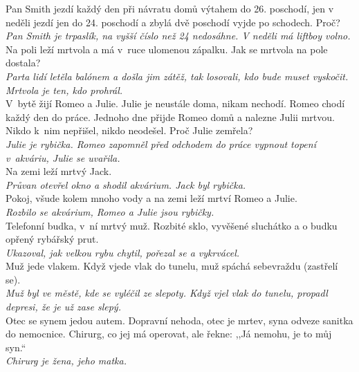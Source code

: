 \begin{multicols}{2}
\noindent
Pan Smith jezdí každý den při návratu domů výtahem do 26. 
poschodí, jen v neděli jezdí jen do 24. poschodí a zbylá dvě 
poschodí vyjde po schodech. Proč?\\[1 mm]
{\sl Pan Smith je trpaslík, na vyšší číslo než 24 nedosáhne. V 
neděli má liftboy volno.}\\

\noindent
Na poli leží mrtvola a má v~ruce ulomenou zápalku. Jak se mrtvola
na pole dostala?\\[1 mm]
{\sl Parta lidí letěla balónem a došla jim zátěž, tak losovali, 
kdo bude muset vyskočit. Mrtvola je ten, kdo prohrál.}\\

\noindent
V~bytě žijí Romeo a Julie. Julie je neustále doma, 
nikam nechodí. Romeo chodí každý den do práce. Jednoho dne přijde 
Romeo domů a nalezne Julii mrtvou. Nikdo k~nim nepřišel, 
nikdo neodešel. Proč Julie zemřela?\\[1 mm]
{\sl Julie je rybička. Romeo zapomněl před odchodem do práce vypnout 
topení v~akváriu, Julie se uvařila.}\\

\noindent
Na zemi leží mrtvý Jack.\\[1 mm]
{\sl Průvan otevřel okno a shodil akvárium. Jack byl rybička.}\\

\noindent
Pokoj, všude kolem mnoho vody a na zemi leží mrtví 
Romeo a Julie.\\[1 mm]
{\sl Rozbilo se akvárium, Romeo a Julie jsou rybičky.}\\

\noindent
Telefonní budka, v~ní mrtvý muž. Rozbité sklo, 
vyvěšené sluchátko a o budku opřený rybářský prut.\\[1 mm]
{\sl Ukazoval, jak velkou rybu chytil, pořezal se a vykrvácel.}\\

\noindent
Muž jede vlakem. Když vjede vlak do tunelu, muž 
spáchá sebevraždu (zastřelí se).\\[1 mm]
{\sl Muž byl ve městě, kde se vyléčil ze slepoty. Když vjel vlak 
do tunelu, propadl depresi, že je už zase slepý.}\\

\noindent
Otec se synem jedou autem. Dopravní nehoda, otec je mrtev, 
syna odveze sanitka do nemocnice. Chirurg, co jej má operovat, 
ale řekne: ,,Já nemohu, je to můj syn.``\\[1 mm]
{\sl Chirurg je žena, jeho matka.}\\


\end{multicols}
